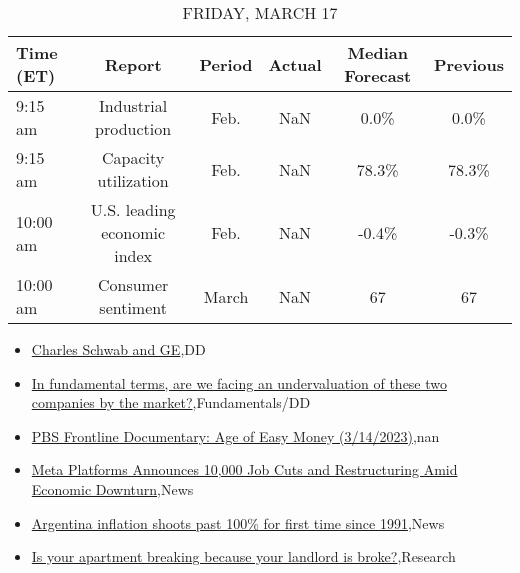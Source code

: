 \documentclass{article}%
\begin{document}
%


\begin{table}[htbp]%
\caption{FRIDAY, MARCH 17}%
\centering%
\begin{adjustbox}{width=1\textwidth}%
\begin{tabular}{lccccc}
\toprule
Time (ET) &                      Report & Period & Actual & Median Forecast & Previous \\
\midrule
  9:15 am &       Industrial production &   Feb. &    NaN &            0.0\% &     0.0\% \\
  9:15 am &        Capacity utilization &   Feb. &    NaN &           78.3\% &    78.3\% \\
 10:00 am & U.S. leading economic index &   Feb. &    NaN &           -0.4\% &    -0.3\% \\
 10:00 am &          Consumer sentiment &  March &    NaN &              67 &       67 \\
\bottomrule
\end{tabular}
%
\end{adjustbox}%
\end{table}

%
\begin{itemize}%
\item%
\href{https://reddit.com/r/wallstreetbets/comments/11rv9ar/charles\_schwab\_and\_ge/}{Charles Schwab and GE},DD%
\item%
\href{https://reddit.com/r/StockMarket/comments/11rudto/in\_fundamental\_terms\_are\_we\_facing\_an/}{In fundamental terms, are we facing an undervaluation of these two companies by the market?},Fundamentals/DD%
\item%
\href{https://reddit.com/r/Economics/comments/11rkqcu/pbs\_frontline\_documentary\_age\_of\_easy\_money/}{PBS Frontline Documentary: Age of Easy Money (3/14/2023)},nan%
\item%
\href{https://reddit.com/r/Economics/comments/11rjawd/meta\_platforms\_announces\_10000\_job\_cuts\_and/}{Meta Platforms Announces 10,000 Job Cuts and Restructuring Amid Economic Downturn},News%
\item%
\href{https://reddit.com/r/Economics/comments/11rgvz4/argentina\_inflation\_shoots\_past\_100\_for\_first/}{Argentina inflation shoots past 100\% for first time since 1991},News%
\item%
\href{https://reddit.com/r/Economics/comments/11rfzmj/is\_your\_apartment\_breaking\_because\_your\_landlord/}{Is your apartment breaking because your landlord is broke?},Research%
\end{itemize}%
\end{document}

